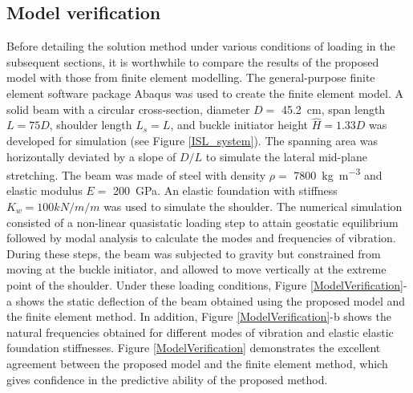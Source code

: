 \documentclass[3p,doublespacing,authoryear,11pt]{elsarticle} %
\begin{document}
\subsection{Model verification}
Before detailing the solution method under various conditions of loading in the subsequent sections, it is worthwhile to compare the results of the proposed model with those from finite element modelling. The general-purpose finite element software package Abaqus was used to create the finite element model. A solid beam with a circular cross-section, diameter $D =$ \SI{45.2}{\centi\meter}, span length $L = 75D$, shoulder length $L_s = L$, and buckle initiator height $\hat{H} = 1.33 D$  was developed for simulation (see Figure \ref{ISL_system}). The spanning area was horizontally deviated by a slope of $D/L$ to simulate the lateral mid-plane stretching. The beam was made of steel with density $\rho =$ \SI{7800}{\kilogram\per\meter\cubed} and elastic modulus $E =$ \SI{200}{\giga\pascal}. An elastic foundation with stiffness $K_w = 100 kN/m/m$ was used to simulate the shoulder. The numerical simulation consisted of a non-linear quasistatic loading step to attain geostatic equilibrium followed by modal analysis to calculate the modes and frequencies of vibration. During these steps, the beam was subjected to gravity but constrained from moving at the buckle initiator, and allowed to move vertically at the extreme point of the shoulder. Under these loading conditions, Figure \ref{ModelVerification}-a shows the static deflection of the beam obtained using the proposed model and the finite element method. In addition, Figure \ref{ModelVerification}-b shows the natural frequencies obtained for different modes of vibration and elastic elastic foundation stiffnesses. Figure \ref{ModelVerification} demonstrates the excellent agreement between the proposed model and the finite element method, which gives confidence in the predictive ability of the proposed method. 
\end{document}
